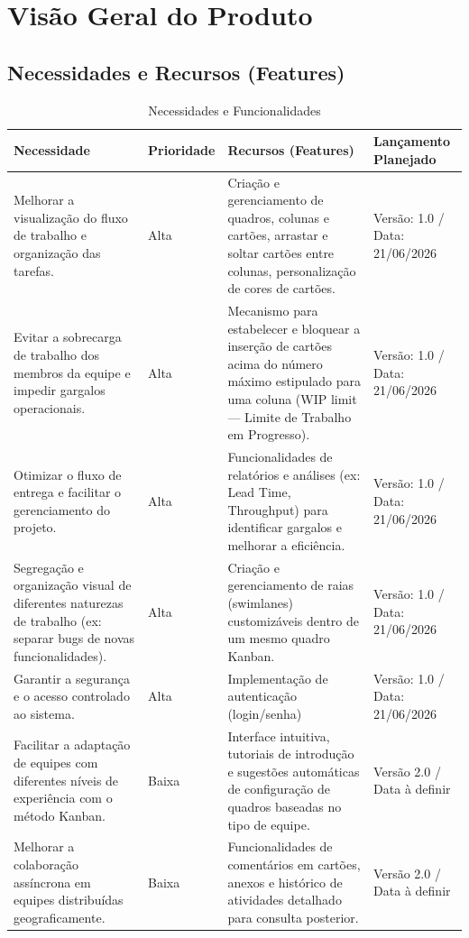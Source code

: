 \section{Visão Geral do Produto}
\subsection{Necessidades e Recursos (Features)}
\begin{table}[H]
    \centering
    \begin{tabular}{|p{4cm}|p{2cm}|p{6cm}|p{2cm}|}
        \hline
        \textbf{Necessidade} & \textbf{Prioridade} & \textbf{Recursos (Features)} & \textbf{Lançamento Planejado} \\ \hline
        Melhorar a visualização do fluxo de trabalho e organização das tarefas. & Alta & Criação e gerenciamento de quadros, colunas e cartões, arrastar e soltar cartões entre colunas, personalização de cores de cartões. & Versão: 1.0 / Data: 21/06/2026 \\ \hline
        Evitar a sobrecarga de trabalho dos membros da equipe e impedir gargalos operacionais. & Alta & Mecanismo para estabelecer e bloquear a inserção de cartões acima do número máximo estipulado para uma coluna (WIP limit — Limite de Trabalho em Progresso). & Versão: 1.0 / Data: 21/06/2026 \\ \hline
        Otimizar o fluxo de entrega e facilitar o gerenciamento do projeto. & Alta & Funcionalidades de relatórios e análises (ex: Lead Time, Throughput) para identificar gargalos e melhorar a eficiência. & Versão: 1.0 / Data: 21/06/2026 \\ \hline
        Segregação e organização visual de diferentes naturezas de trabalho (ex: separar bugs de novas funcionalidades). & Alta & Criação e gerenciamento de raias (swimlanes) customizáveis dentro de um mesmo quadro Kanban. & Versão: 1.0 / Data: 21/06/2026 \\ \hline
        Garantir a segurança e o acesso controlado ao sistema. & Alta & Implementação de autenticação (login/senha) & Versão: 1.0 / Data: 21/06/2026 \\ \hline
        Facilitar a adaptação de equipes com diferentes níveis de experiência com o método Kanban. & Baixa & Interface intuitiva, tutoriais de introdução e sugestões automáticas de configuração de quadros baseadas no tipo de equipe. & Versão 2.0 / Data à definir \\ \hline
        Melhorar a colaboração assíncrona em equipes distribuídas geograficamente. & Baixa & Funcionalidades de comentários em cartões, anexos e histórico de atividades detalhado para consulta posterior. & Versão 2.0 / Data à definir \\ \hline
    \end{tabular}
    \caption{Necessidades e Funcionalidades}
\end{table}

